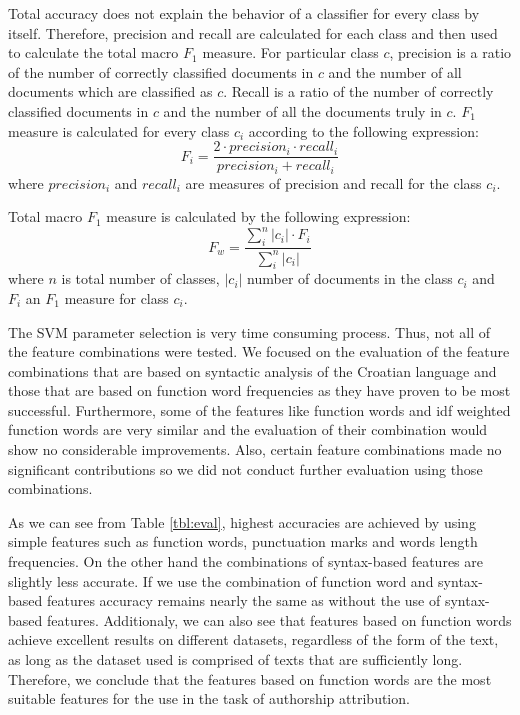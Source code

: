 \documentclass{llncs}
\begin{document}
Total accuracy does not explain the behavior of a classifier for every class by
itself. Therefore, precision and recall are calculated for each class and then
used to calculate the total macro $F_1$ measure. For particular class $c$,
precision is a ratio of the number of correctly classified documents in $c$ and
the number of all documents which are classified as $c$. Recall is a ratio of the
number of correctly classified documents in $c$ and the number of all the
documents truly in $c$. $F_1$ measure is calculated for every class $c_i$
according to the following expression:
\begin{equation}
F_i = \frac{2 \cdot precision_i \cdot recall_i}{precision_i + recall_i}
\end{equation}
where $precision_i$ and $recall_i$ are measures of precision and recall for
the class $c_i$.

Total macro $F_1$ measure is calculated by the following expression:
\begin{equation}
F_w = \frac{\sum^{n}_i |c_i|\cdot F_i}{\sum^n_i|c_i|}
\end{equation}
where $n$ is total number of classes, $|c_i|$ number of documents in the class
$c_i$ and $F_i$ an $F_1$ measure for class $c_i$.

The SVM parameter selection is very time consuming process. Thus, not all of the
feature combinations were tested. We focused on the evaluation of the feature
combinations that are based on syntactic analysis of the Croatian language and
those that are based on function word frequencies as they have proven to be most
successful. Furthermore, some of the features like function words and idf
weighted function words are very similar and the evaluation of their combination
would show no considerable improvements. Also, certain feature combinations made
no significant contributions so we did not conduct further evaluation using
those combinations.

As we can see from Table \ref{tbl:eval}, highest accuracies are achieved by
using simple features such as function words, punctuation marks and words length
frequencies. On the other hand the combinations of syntax-based features are
slightly less accurate. If we use the combination of function word and
syntax-based features accuracy remains nearly the same as without the use of syntax-based
features. Additionaly, we can also see that features based on function
words achieve excellent results on different datasets, regardless of the form of
the text, as long as the dataset used is comprised of texts that are
sufficiently long. Therefore, we conclude that the features based on function
words are the most suitable features for the use in the task of authorship
attribution.
\end{document}
